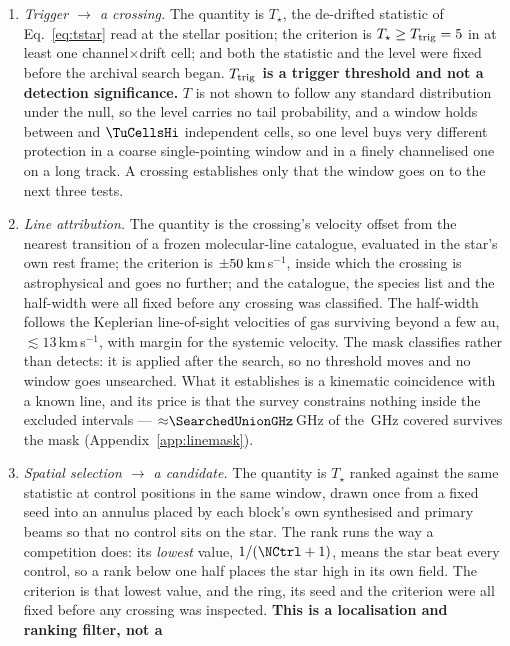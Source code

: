 \begin{enumerate}[label=(\roman*),leftmargin=1.9em,itemsep=3pt,topsep=3pt,parsep=0pt]
\item \emph{Trigger $\to$ a crossing.} The quantity is $T_\star$, the
de-drifted statistic of Eq.~\ref{eq:tstar} read at the stellar position; the
criterion is $T_\star\geq T_{\rm trig}=5$ in at least one
channel$\times$drift cell; and both the statistic and the level were fixed
before the archival search began. \textbf{$T_{\rm trig}$ is a trigger
threshold and not a detection significance.} $T$ is not shown to follow any
standard distribution under the null, so the level carries no tail
probability, and a window holds between \TuCellsLo{} and $\TuCellsHi$
independent cells, so one level buys very different protection in a coarse
single-pointing window and in a finely channelised one on a long track. A
crossing establishes only that the window goes on to the next three tests.
\item \emph{Line attribution.} The quantity is the crossing's velocity
offset from the nearest transition of a frozen molecular-line catalogue,
evaluated in the star's own rest frame; the criterion is
$\pm50$\,km\,s$^{-1}$, inside which the crossing is astrophysical
and goes no further; and the catalogue, the species list and the half-width
were all fixed before any crossing was classified. The half-width follows
the Keplerian line-of-sight velocities of gas surviving beyond a few au,
${\lesssim}13$\,km\,s$^{-1}$, with margin for the systemic velocity. The
mask classifies rather than detects: it is applied after the search, so no
threshold moves and no window goes unsearched. What it establishes is a
kinematic coincidence with a known line, and its price is that the survey
constrains nothing inside the excluded intervals ---
${\approx}\SearchedUnionGHz$\,GHz of the \UnionGHz\,GHz covered survives the
mask (Appendix~\ref{app:linemask}).
\item \emph{Spatial selection $\to$ a candidate.} The quantity is $T_\star$
ranked against the same statistic at \NCtrl{} control positions in the same
window, drawn once from a fixed seed into an annulus placed by each block's
own synthesised and primary beams so that no control sits on the star. The
rank runs the way a competition does: its \emph{lowest} value,
$1/(\NCtrl+1)$, means the star beat every control, so a rank below one half
places the star high in its own field. The criterion is that lowest value,
and the ring, its seed and the criterion were all fixed before any crossing
was inspected. \textbf{This is a localisation and ranking filter, not a
}
\end{enumerate}
